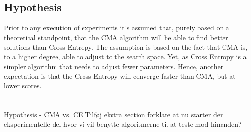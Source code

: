 \subsection{Hypothesis}

Prior to any execution of experiments it's assumed that, purely based 
on a theoretical standpoint, that the CMA algorithm will be able to 
find better solutions than Cross Entropy. The assumption is based 
on the fact that CMA is, to a higher degree, able to adjust to the 
search space. Yet, as Cross Entropy is a simpler algorithm that needs 
to adjust fewer parameters. Hence, another expectation is that the 
Cross Entropy will converge faster than CMA, but at lower scores.\\
\\
\\
Hypothesis - CMA vs. CE
Tilføj ekstra section forklare at nu starter 
den eksperimentelle del hvor vi vil 
benytte algoritmerne til at teste mod hinanden?
